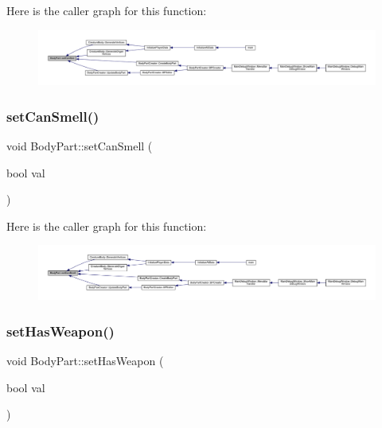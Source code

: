 Here is the caller graph for this function\+:
\nopagebreak
\begin{figure}[H]
\begin{center}
\leavevmode
\includegraphics[width=350pt]{d2/d6f/class_body_part_acc7c6792cd9837901dfb7d639714eb00_icgraph}
\end{center}
\end{figure}
\mbox{\label{class_body_part_acc147f8434d4bf881ee4b54e1b79c439}} 
\subsubsection{\texorpdfstring{set\+Can\+Smell()}{setCanSmell()}}
{\footnotesize\ttfamily void Body\+Part\+::set\+Can\+Smell (\begin{DoxyParamCaption}\item[{bool}]{val }\end{DoxyParamCaption})}

Here is the caller graph for this function\+:
\nopagebreak
\begin{figure}[H]
\begin{center}
\leavevmode
\includegraphics[width=350pt]{d2/d6f/class_body_part_acc147f8434d4bf881ee4b54e1b79c439_icgraph}
\end{center}
\end{figure}
\mbox{\label{class_body_part_a15d3ae087969dc50e7db331c73bd346b}} 
\subsubsection{\texorpdfstring{set\+Has\+Weapon()}{setHasWeapon()}}
{\footnotesize\ttfamily void Body\+Part\+::set\+Has\+Weapon (\begin{DoxyParamCaption}\item[{bool}]{val }\end{DoxyParamCaption})}

